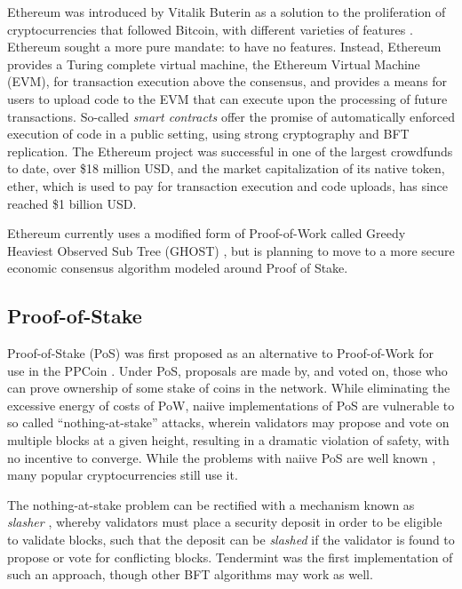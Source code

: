 Ethereum was introduced by Vitalik Buterin as a solution to the proliferation of cryptocurrencies that followed Bitcoin,
with different varieties of features \cite{buterin2013ethereum}.
Ethereum sought a more pure mandate: to have no features.
Instead, Ethereum provides a Turing complete virtual machine, the Ethereum Virtual Machine (EVM), for transaction execution above the consensus,
and provides a means for users to upload code to the EVM that can execute upon the processing of future transactions.
So-called \emph{smart contracts} \cite{szabo1997formalizing} offer the promise of automatically enforced execution of code in a public setting, 
using strong cryptography and BFT replication. 
The Ethereum project was successful in one of the largest crowdfunds to date, over \$18 million USD, 
and the market capitalization of its native token, ether, which is used to pay for transaction execution and code uploads,
has since reached \$1 billion USD.

Ethereum currently uses a modified form of Proof-of-Work called Greedy Heaviest Observed Sub Tree (GHOST) \cite{ghost},
but is planning to move to a more secure economic consensus algorithm modeled around Proof of Stake.

\subsection{Proof-of-Stake}

Proof-of-Stake (PoS) was first proposed as an alternative to Proof-of-Work for use in the 
PPCoin \cite{king2012ppcoin}.
Under PoS, proposals are made by, and voted on, 
those who can prove ownership of some stake of coins in the network.
While eliminating the excessive energy of costs of PoW, 
naiive implementations of PoS are vulnerable to so called ``nothing-at-stake'' attacks,
wherein validators may propose and vote on multiple blocks at a given height,
resulting in a dramatic violation of safety, with no incentive to converge.
While the problems with naiive PoS are well known \cite{poelstra2014distributed},
many popular cryptocurrencies still use it.

The nothing-at-stake problem can be rectified with a mechanism known as \emph{slasher} \cite{slasher},
whereby validators must place a security deposit in order to be eligible to validate blocks,
such that the deposit can be \emph{slashed} if the validator is found to propose or vote for conflicting blocks.
Tendermint was the first implementation of such an approach,
though other BFT algorithms may work as well.

